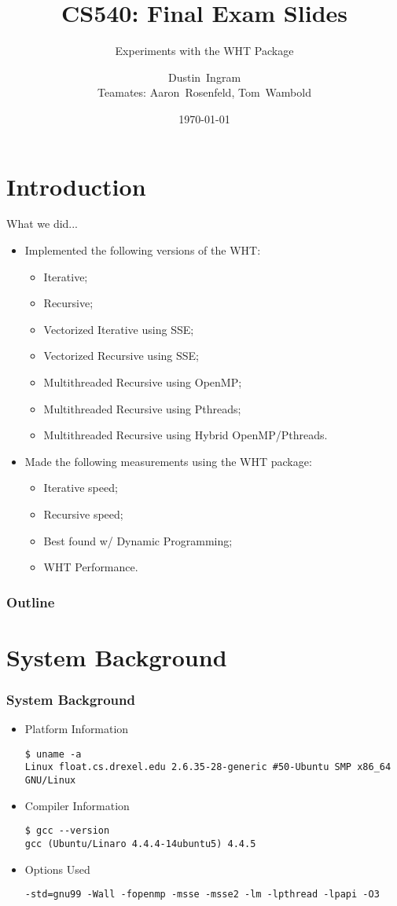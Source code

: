 \documentclass[mathserif,usenames,dvipsnames]{beamer}
\title[Slide \insertframenumber/\inserttotalframenumber]{CS540: Final Exam Slides}
\subtitle{Experiments with the WHT Package}
\author[Ingram]{ 
Dustin~Ingram\\ \scriptsize{Teamates: Aaron~Rosenfeld, Tom~Wambold}}
\institute{
    Drexel University Department of Computer Science, Philadelphia PA\\
}
\date{\today}
\begin{document}
\frame %
{
    \titlepage
} 

\section{Introduction}
\frame %
{
    What we did...
    \begin{itemize}
        \item Implemented the following versions of the WHT:
        \begin{itemize}
            \item Iterative;
            \item Recursive;
            \item Vectorized Iterative using SSE;
            \item Vectorized Recursive using SSE;
            \item Multithreaded Recursive using OpenMP;
            \item Multithreaded Recursive using Pthreads;
            \item Multithreaded Recursive using Hybrid OpenMP/Pthreads.
        \end{itemize}
        \item Made the following measurements using the WHT package:
        \begin{itemize}
            \item Iterative speed;
            \item Recursive speed;
            \item Best found w/ Dynamic Programming;
            \item WHT Performance.
        \end{itemize}
    \end{itemize}
}

\frame %
{
    \frametitle{Outline}
    \tableofcontents
}

\section{System Background}
\begin{frame}[fragile] %
    \frametitle{System Background}
    \begin{itemize}
        \item Platform Information 
\lstset{basicstyle=\tiny}
\begin{lstlisting}
$ uname -a
Linux float.cs.drexel.edu 2.6.35-28-generic #50-Ubuntu SMP x86_64 GNU/Linux
\end{lstlisting}
        \item Compiler Information
\begin{lstlisting}
$ gcc --version
gcc (Ubuntu/Linaro 4.4.4-14ubuntu5) 4.4.5
\end{lstlisting}
        \item Options Used 
\begin{lstlisting}
-std=gnu99 -Wall -fopenmp -msse -msse2 -lm -lpthread -lpapi -O3
\end{lstlisting}
    \end{itemize}
    
\end{frame}
\end{document}
